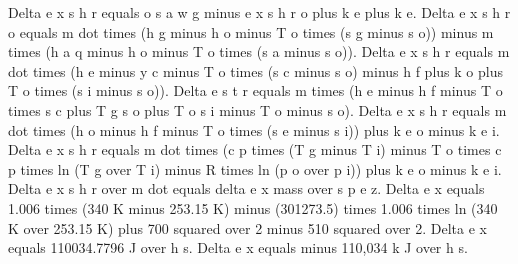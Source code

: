Delta e x s h r equals o s a w g minus e x s h r o plus k e plus k e.  
Delta e x s h r o equals m dot times (h g minus h o minus T o times (s g minus s o)) minus m times (h a q minus h o minus T o times (s a minus s o)).  
Delta e x s h r equals m dot times (h e minus y c minus T o times (s c minus s o) minus h f plus k o plus T o times (s i minus s o)).  
Delta e s t r equals m times (h e minus h f minus T o times s c plus T g s o plus T o s i minus T o minus s o).  
Delta e x s h r equals m dot times (h o minus h f minus T o times (s e minus s i)) plus k e o minus k e i.  
Delta e x s h r equals m dot times (c p times (T g minus T i) minus T o times c p times ln (T g over T i) minus R times ln (p o over p i)) plus k e o minus k e i.  
Delta e x s h r over m dot equals delta e x mass over s p e z.  
Delta e x equals 1.006 times (340 K minus 253.15 K) minus (301273.5) times 1.006 times ln (340 K over 253.15 K) plus 700 squared over 2 minus 510 squared over 2.  
Delta e x equals 110034.7796 J over h s.  
Delta e x equals minus 110,034 k J over h s.